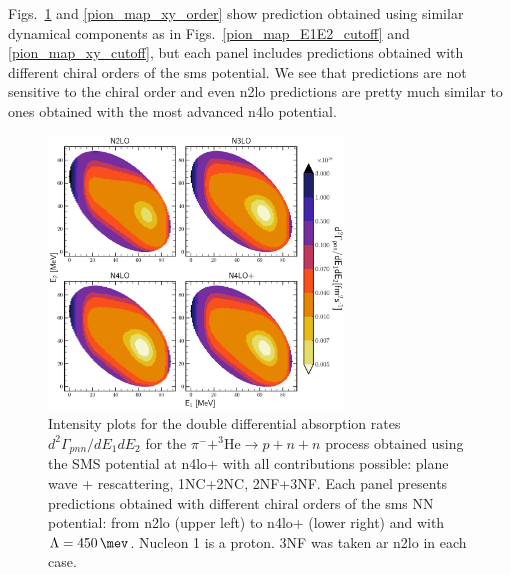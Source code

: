     Figs.~\ref{pion_map_E1E2_order} and \ref{pion_map_xy_order} show prediction obtained using similar
    dynamical components
    as in Figs.~\ref{pion_map_E1E2_cutoff} and \ref{pion_map_xy_cutoff}, but each panel includes
    predictions obtained with different chiral orders of the \gls{sms} potential.
    We see that predictions are not sensitive to the chiral order and even \gls{n2lo} predictions
    are pretty much similar to ones obtained with the most advanced \gls{n4lo} potential.
     
    
    \begin{figure}[h]
        \begin{center}
            \includegraphics[width=0.7\textwidth]{PlotData/PION/Dalitz_maps/figures/Dalitz_map_pnn_E1E2_orders.pdf}
        \end{center}
        \caption{Intensity plots for the double differential absorption rates
        $d^2 \Gamma_{pnn}/dE_1dE_2$ for the $\pi^- + ^3\text{He} \rightarrow p + n + n$
        process obtained using the SMS potential at \gls{n4lo+}
        with all contributions possible: plane wave + rescattering, 1NC+2NC, 2NF+3NF.
        Each panel presents predictions obtained with different chiral orders of the \gls{sms} NN potential:
        from \gls{n2lo} (upper left) to \gls{n4lo+} (lower right) and with $\Lambda = \SI{450}{\mev}$.
        Nucleon 1 is a proton. 3NF was taken ar \gls{n2lo} in each case.}
        \label{pion_map_E1E2_order}
    \end{figure}

